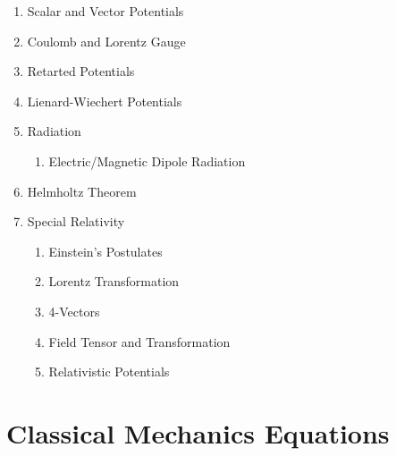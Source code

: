 \documentclass[12pt]{extarticle}
\begin{document}
\begin{enumerate}
\begin{enumerate}
\begin{enumerate}
    \end{enumerate}
  \end{enumerate}
  \item{Scalar and Vector Potentials}
  \item{Coulomb and Lorentz Gauge}
  \item{Retarted Potentials}
  \item{Lienard-Wiechert Potentials}
  \item{Radiation}
  \begin{enumerate}
    \item{Electric/Magnetic Dipole Radiation}
  \end{enumerate}
  \item{Helmholtz Theorem}
  \item{Special Relativity}
  \begin{enumerate}
    \item{Einstein's Postulates}
    \item{Lorentz Transformation}
    \item{4-Vectors}
    \item{Field Tensor and Transformation}
    \item{Relativistic Potentials}
  \end{enumerate}

\end{enumerate}

\newpage
\section{Classical Mechanics Equations}
\end{document}
